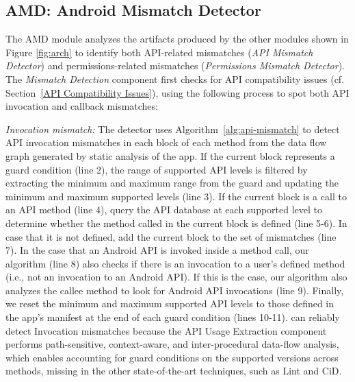  
 
\subsection{AMD: Android Mismatch Detector} 
\label{mismatchdetection}

The AMD module analyzes the artifacts
produced by the other modules shown in Figure \ref{fig:arch} to identify both
API-related mismatches ({\it API Mismatch Detector}) and permissions-related
mismatches ({\it Permissions Mismatch
Detector}).
The \textit{Mismatch Detection} component first checks for API compatibility issues (cf.
Section~\ref{API Compatibility Issues}), using the following process to spot both
API invocation and callback mismatches:
 

\textit{Invocation mismatch:} The detector uses
Algorithm~\ref{alg:api-mismatch} to detect API invocation
mismatches in each block of each method from the data flow
graph generated by static analysis of the app. If the
current block represents a guard condition (line 2), the
range of supported API levels is filtered by extracting the
minimum and maximum range from the guard and
updating the minimum and maximum supported levels (line 3).
If the current block is a call to an API method (line 4),
query the API database at each supported level to determine
whether the method called in the current block is defined
(line 5-6).  In case that it is not defined, add the current
block to the set of mismatches (line 7).
%
In the case that an Android API is invoked inside a method
call, our algorithm (line 8) also checks if there is an
invocation to a user's defined method (i.e., not an
invocation to an Android API).  If this is the case, our
algorithm also analyzes the callee method  to look
for Android API invocations (line 9).
Finally, we reset the minimum and maximum supported
API levels to those defined in the app's manifest at the end
of each guard condition (lines 10-11).
%
%
%
\@approach can reliably detect Invocation mismatches because
the API Usage Extraction component performs path-sensitive,
context-aware, and inter-procedural data-flow analysis,
which enables accounting for guard conditions on the
supported versions across methods, missing in the other
state-of-the-art techniques, such as {\sc Lint} and {\sc
CiD}.




